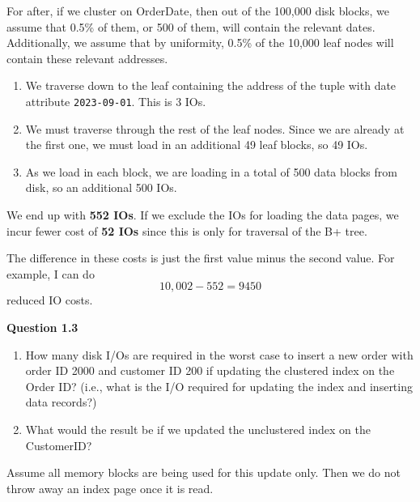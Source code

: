 \documentclass{article}
\begin{document}
\begin{example}
      For after, if we cluster on OrderDate, then out of the 100,000 disk blocks, we assume that 0.5\% of them, or 500 of them, will contain the relevant dates. Additionally, we assume that by uniformity, 0.5\% of the 10,000 leaf nodes will contain these relevant addresses. 
      \begin{enumerate}
        \item We traverse down to the leaf containing the address of the tuple with date attribute \texttt{2023-09-01}. This is 3 IOs. 
        \item We must traverse through the rest of the leaf nodes. Since we are already at the first one, we must load in an additional 49 leaf blocks, so 49 IOs. 
        \item As we load in each block, we are loading in a total of 500 data blocks from disk, so an additional 500 IOs. 
      \end{enumerate}
      We end up with \textbf{552 IOs}. If we exclude the IOs for loading the data pages, we incur fewer cost of \textbf{52 IOs} since this is only for traversal of the B+ tree. 

      The difference in these costs is just the first value minus the second value. For example, I can do 
      \begin{equation}
        10,002 - 552 = 9450
      \end{equation}
      reduced IO costs. 


      \vspace{1em}
      \noindent\textbf{Question 1.3}
      \begin{enumerate}[label=(\alph*)]
        \item How many disk I/Os are required in the worst case to insert a new order with order ID 2000 and customer ID 200 if updating the clustered index on the Order ID? (i.e., what is the I/O required for updating the index and inserting data records?)
        \item What would the result be if we updated the unclustered index on the CustomerID?
      \end{enumerate}

      Assume all memory blocks are being used for this update only. Then we do not throw away an index page once it is read.


\end{example}
\end{document}
